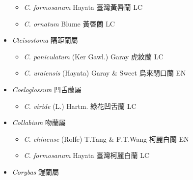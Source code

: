 \begin{itemize}
  \begin{itemize}
        \item[] \textit{C. formosanum} Hayata  臺灣黃唇蘭   LC
        \item[] \textit{C. ornatum} Blume  黃唇蘭   LC
  \end{itemize}
 \item[] \textit{Cleisostoma} 隔距蘭屬
                                
  \begin{itemize}
        \item[] \textit{C. paniculatum} (Ker Gawl.) Garay  虎紋蘭   LC
        \item[] \textit{C. uraiensis} (Hayata) Garay \& Sweet  烏來閉口蘭   EN
  \end{itemize}
 \item[] \textit{Coeloglossum} 凹舌蘭屬
                                
  \begin{itemize}
        \item[] \textit{C. viride} (L.) Hartm.  綠花凹舌蘭   LC
  \end{itemize}
 \item[] \textit{Collabium} 吻蘭屬
                                
  \begin{itemize}
        \item[] \textit{C. chinense} (Rolfe) T.Tang \& F.T.Wang  柯麗白蘭   EN
        \item[] \textit{C. formosanum} Hayata  臺灣柯麗白蘭   LC
  \end{itemize}
 \item[] \textit{Corybas} 鎧蘭屬
                                

\end{itemize}
